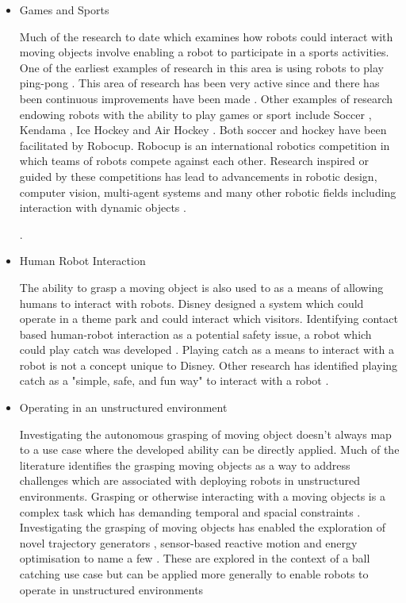 \begin{itemize}
    \item Games and Sports
    
    Much of the research to date which examines how robots could interact with moving objects involve enabling a robot to participate in a sports activities. One of the earliest examples of research in this area is using robots to play ping-pong \cite{Anderson1989}. This area of research has been very active since and there has been continuous improvements have been made \cite{Koc2018}. Other examples of research endowing robots with the ability to play games or sport include Soccer \cite{RoboCupSoccer}, Kendama \cite{Kendama}, Ice Hockey \cite{IceHockey} and Air Hockey \cite{AirHockey}. Both soccer and hockey have been facilitated by Robocup. Robocup is an international robotics competition in which teams of robots compete against each other. Research inspired or guided by these competitions has lead to advancements in robotic design, computer vision, multi-agent systems and many other robotic fields including interaction with dynamic objects \cite{RoboCupSoccer, FuzzyRobocup}. 
    
\cite{RoboCupSoccer}.
    
    \item Human Robot Interaction
    
    The ability to grasp a moving object is also used to as a means of allowing humans to interact with robots. Disney designed a system which could operate in a theme park and could interact which visitors. Identifying contact based human-robot interaction as a potential safety issue, a robot which could play catch was developed \cite{DisneyRobot}. Playing catch as a means to interact with a robot is not a concept unique to Disney. Other research has identified playing catch as a "simple, safe, and fun way" to interact with a robot \cite{JugglingWithKitchenFunnels}.
    
    \item Operating in an unstructured environment
    
    Investigating the autonomous grasping of moving object doesn't always map to a use case where the developed ability can be directly applied. Much of the literature identifies the grasping moving objects as a way to address challenges which are associated with deploying robots in unstructured environments. Grasping or otherwise interacting with a moving objects is a complex task which has demanding temporal and spacial constraints \cite{Anderson1989, EarlyAnticipation}. Investigating the grasping of moving objects has enabled the exploration of novel trajectory generators \cite{Senoo2006, Lampariello2011}, sensor-based reactive motion \cite{Senoo2006} and energy optimisation \cite{Lampariello2011} to name a few . These are explored in the context of a ball catching use case but can be applied more generally to enable robots to operate in unstructured environments 
\end{itemize}



